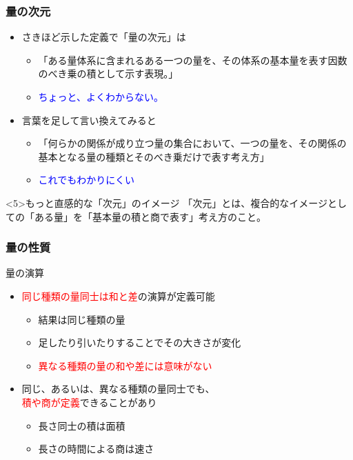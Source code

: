 \documentclass[unicode,12pt,aspectratio=169]{beamer}
\begin{document}
\begin{frame}
	\frametitle{量の次元}
	\begin{itemize}
		\item さきほど示した定義で「量の次元」は
		\begin{itemize}
			\item 「ある量体系に含まれるある一つの量を、その体系の基本量を表す因数のべき乗の積として示す表現。」
			\item<2-> \textcolor{blue}{ちょっと、よくわからない。}
		\end{itemize}
		\item<3-> 言葉を足して言い換えてみると
		\begin{itemize}
			\item 「何らかの関係が成り立つ量の集合において、一つの量を、その関係の基本となる量の種類とそのべき乗だけで表す考え方」
			\item<4-> \textcolor{blue}{これでもわかりにくい}
		\end{itemize}
	\end{itemize}
	\begin{alertblock}{もっと直感的な「次元」のイメージ}
		「次元」とは、複合的なイメージとしての「ある量」を「基本量の積と商で表す」考え方のこと。
	\end{alertblock}
\end{frame}

\begin{frame}
	\frametitle{量の性質}
	\begin{alertblock}{量の演算}
		\begin{itemize}
			\item \textcolor{red}{同じ種類の量同士は和と差}の演算が定義可能
			\begin{itemize}
				\item 結果は同じ種類の量
				\item 足したり引いたりすることでその大きさが変化
				\item \textcolor{red}{異なる種類の量の和や差には意味がない}
			\end{itemize}
			\item 同じ、あるいは、異なる種類の量同士でも、\\ \textcolor{red}{積や商が定義}できることがあり
			\begin{itemize}
				\item 長さ同士の積は面積
				\item 長さの時間による商は速さ
			\end{itemize}
		\end{itemize}
	\end{alertblock}
\end{frame}
\end{document}
